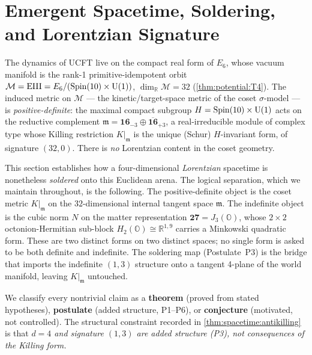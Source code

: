 \section{Emergent Spacetime, Soldering, and Lorentzian Signature}
\label{sec:spacetime:main}
\label{sec:soldering:main}
\label{sec:soldering}

The dynamics of UCFT live on the compact real form of $E_6$, whose vacuum
manifold is the rank-1 primitive-idempotent orbit
$\mathcal M = \mathrm{EIII} = E_6/(\operatorname{Spin}(10)\times\mathrm{U}(1))$, $\dim_{\mathbb R}\mathcal M = 32$
(\autoref{thm:potential:T4}). The induced metric on $\mathcal M$ --- the
kinetic/target-space metric of the coset $\sigma$-model --- is
\emph{positive-definite}: the maximal compact subgroup
$H = \operatorname{Spin}(10)\times\mathrm{U}(1)$ acts on the reductive complement
$\mathfrak m = \mathbf{16}_{-3}\oplus\overline{\mathbf{16}}_{+3}$, a real-irreducible
module of complex type whose Killing restriction $K|_{\mathfrak m}$ is the unique
(Schur) $H$-invariant form, of signature $(32,0)$. There is \emph{no} Lorentzian
content in the coset geometry.

This section establishes how a four-dimensional \emph{Lorentzian} spacetime is
nonetheless \emph{soldered} onto this Euclidean arena. The logical separation, which
we maintain throughout, is the following. The positive-definite object is the coset
metric $K|_{\mathfrak m}$ on the $32$-dimensional internal tangent space $\mathfrak m$.
The indefinite object is the cubic norm $N$ on the matter representation
$\mathbf{27}=J_3(\mathbb O)$, whose $2\times2$ octonion-Hermitian sub-block
$H_2(\mathbb O)\cong\mathbb R^{1,9}$ carries a Minkowski quadratic form. These are
two distinct forms on two distinct spaces; no single form is asked to be both
definite and indefinite. The soldering map (Postulate~P3) is the bridge that imports
the indefinite $(1,3)$ structure onto a tangent 4-plane of the world manifold,
leaving $K|_{\mathfrak m}$ untouched.

We classify every nontrivial claim as a \textbf{theorem} (proved from stated
hypotheses), \textbf{postulate} (added structure, P1--P6), or
\textbf{conjecture} (motivated, not controlled). The structural constraint
recorded in \autoref{thm:spacetime:antikilling} is that \emph{$d=4$ and signature
$(1,3)$ are added structure (P3), not consequences of the Killing form.}

